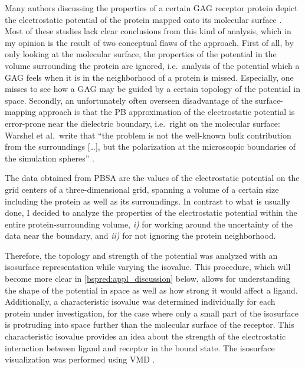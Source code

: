 Many authors discussing the properties of a certain GAG receptor protein depict
the electrostatic potential of the protein mapped onto its molecular surface
\cite{rogers_gag_prot_prot_2011,%
mancera_mmpbsa_gags_2009,sapay_hs_growthfactors_2011,%
gandhi_bmp_heparin_binding_sites_2012,sost_heparin_2009,%
catK_cs4_crystal_structure_2008,hydrolase_gags_2011,gandhi_structure_2008,%
imberty_gag_prot_carbres_2007,gags_as_polyelectrolytes_2010}. Most of these
studies lack clear conclusions from this kind of analysis, which in my opinion
is the result of two conceptual flaws of the approach. First of all, by only
looking at the molecular surface, the properties of the potential in the volume
surrounding the protein are ignored, i.e.\ analysis of the potential which a GAG
feels when it is in the neighborhood of a protein is missed. Especially, one
misses to see how a GAG may be guided by a certain topology of the potential in
space. Secondly, an unfortunately often overseen disadvantage of the
surface-mapping approach is that the PB approximation of the electrostatic
potential is  error-prone near the dielectric boundary, i.e.\ right
on the molecular surface: Warshel et al.\ write that \enquote{the problem is not
the well-known bulk contribution from the surroundings [\dots], but the
polarization at the microscopic boundaries of the simulation spheres}
\cite{estatic_proteins_warshel_2006}.


The data obtained from PBSA are the values of the electrostatic potential on the
grid centers of a three-dimensional grid, spanning a volume of a certain size
including the protein as well as its surroundings. In contrast to what is
usually done, I decided to analyze the properties of the electrostatic potential
within the entire protein-surrounding volume, \textit{i)} for working around the
uncertainty of the data near the boundary, and \textit{ii)} for not ignoring the
protein neighborhood.

Therefore, the topology and strength of the potential was analyzed with an
isosurface representation while varying the isovalue. This procedure, which will
become more clear in \cref{bspred:appl_discussion} below, allows for
understanding the shape of the potential in space as well as how strong it would
affect a ligand. Additionally, a characteristic isovalue was determined
individually for each protein under investigation, for the case where only a
small part of the isosurface is protruding into space further than the molecular
surface of the receptor. This characteristic isovalue provides an idea about the
strength of the electrostatic interaction between ligand and receptor in the
bound state. The isosurface visualization was performed using VMD
\cite{vmd_1996}.


